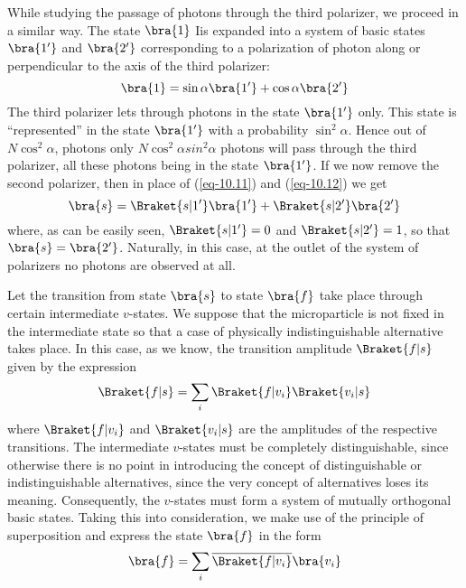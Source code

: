\documentclass[a4paper,sfsidenotes,colorlinks=true]{tufte-book}
\numberwithin{equation}{section}
\numberwithin{figure}{section}
\begin{document}
While studying the passage of photons through the third polarizer, we
proceed in a similar way. The state $\bra{1}$ Iis expanded into a system of
basic states $\bra{1'}$ and $\bra{2'}$ corresponding to a polarization of photon
along or perpendicular to the axis of the third polarizer: 
\begin{equation}
\bra{1} = \sin \alpha \bra{1'} + \cos \alpha \bra{2'}
\label{eq-10.12} 
\end{equation}
The third polarizer lets through photons in the state $\bra{1'}$
only. This state is ``represented'' in the state $\bra{1'}$ with a
probability $\sin^{2} \alpha$. Hence out of $N \cos^{2} \alpha$,
photons only $N \cos^{2} \alpha sin^{2} \alpha$ photons will pass
through the third polarizer, all these photons being in the state
$\bra{1'}$. If we now remove the second polarizer, then in place of
(\ref{eq-10.11}) and (\ref{eq-10.12}) we get
\begin{equation}%
  \bra{s} = \Braket{s|1'} \bra{1'} + \Braket{s|2'} \bra{2'}
\label{eq-10.13} 
\end{equation}
where, as can be easily seen, $\Braket{s|1'} = 0$ and $\Braket{s|2'}
=1 $, so that $\bra{s} = \bra{2'}$. Naturally, in this case, at the
outlet of the system of polarizers no photons are observed at all.

Let the transition from state $\bra{s}$ to
state $\bra{f}$ take place through certain intermediate $v$-states. We
suppose that the microparticle is not fixed in the intermediate state
so that a case of physically indistinguishable alternative takes
place. In this case, as we know, the transition amplitude
$\Braket{f|s}$ given by the expression
\begin{equation}%
\Braket{f|s} = \sum_{i} \Braket{f|v_{i}}\Braket{v_{i}|s} 
\label{eq-10.14} 
\end{equation}
where $\Braket{f|v_{i}}$ and $\Braket{v_{i}|s}$ are the amplitudes of the respective
transitions. The intermediate $v$-states must be completely
distinguishable, since otherwise there is no point in introducing the
concept of distinguishable or indistinguishable alternatives, since
the very concept of alternatives loses its meaning. Consequently, the
$v$-states must form a system of mutually orthogonal basic
states. Taking this into consideration, we make use of the principle
of superposition and express the state $\bra{f}$ in the form
\begin{equation}%
\bra{f} = \sum_{i} \overline{\Braket{f|v_{i}}}\bra{v_{i}}
\label{eq-10.15}
\end{equation}
      
\end{document}
